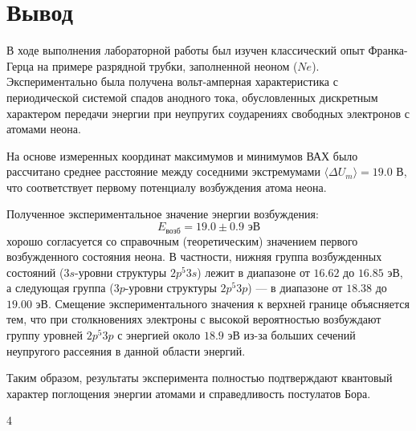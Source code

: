 \documentclass[a4paper,12pt]{article}
\begin{document}
\section{Вывод}

В ходе выполнения лабораторной работы был изучен классический опыт Франка-Герца на примере разрядной трубки, заполненной неоном ($Ne$). Экспериментально была получена вольт-амперная характеристика с периодической системой спадов анодного тока, обусловленных дискретным характером передачи энергии при неупругих соударениях свободных электронов с атомами неона.

На основе измеренных координат максимумов и минимумов ВАХ было рассчитано среднее расстояние между соседними экстремумами $\langle \Delta U_m \rangle = 19.0$ В, что соответствует первому потенциалу возбуждения атома неона.

Полученное экспериментальное значение энергии возбуждения:
\begin{equation*}
E_{\text{возб}} = 19.0 \pm 0.9 \text{ эВ}
\end{equation*}
хорошо согласуется со справочным (теоретическим) значением первого возбужденного состояния неона. В частности, нижняя группа возбужденных состояний ($3s$-уровни структуры $2p^5 3s$) лежит в диапазоне от $16.62$ до $16.85$ эВ, а следующая группа ($3p$-уровни структуры $2p^5 3p$) — в диапазоне от $18.38$ до $19.00$ эВ. Смещение экспериментального значения к верхней границе объясняется тем, что при столкновениях электроны с высокой вероятностью возбуждают группу уровней $2p^5 3p$ с энергией около $18.9$ эВ из-за больших сечений неупругого рассеяния в данной области энергий.

Таким образом, результаты эксперимента полностью подтверждают квантовый характер поглощения энергии атомами и справедливость постулатов Бора.

\vfill
\begin{flushright}
4
\end{flushright}
\end{document}
